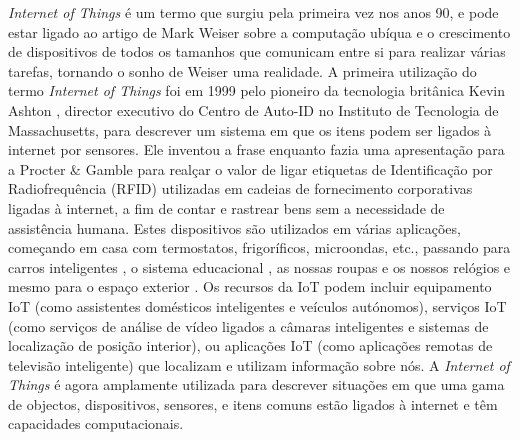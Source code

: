 \documentclass[conference]{IEEEtran}
\begin{document}

\textit{Internet of Things} é um termo que surgiu pela primeira vez nos anos
90, e pode estar ligado ao artigo de Mark Weiser sobre a computação ubíqua
\cite{weiser1991computer} e o crescimento de dispositivos de todos os tamanhos
que comunicam entre si para realizar várias tarefas, tornando o sonho de
Weiser uma realidade. A primeira utilização do termo \textit{Internet of
Things} foi em 1999 pelo pioneiro da tecnologia britânica Kevin Ashton \cite{KevinThat},
director executivo do Centro de Auto-ID no Instituto de Tecnologia de Massachusetts,
para descrever um sistema em que os itens podem ser ligados à internet por
sensores. Ele inventou a frase enquanto fazia uma apresentação para a Procter
\& Gamble para realçar o valor de ligar etiquetas de Identificação por Radiofrequência
(RFID) utilizadas em cadeias de fornecimento corporativas ligadas à internet,
a fim de contar e rastrear bens sem a necessidade de assistência humana.
Estes dispositivos são utilizados em várias aplicações, começando em casa
\cite{marikyan2019systematic} com termostatos, frigoríficos, microondas,
etc., passando para carros inteligentes \cite{arena2020overview}, o sistema
educacional \cite{al2020survey}, as nossas roupas e os nossos relógios \cite{niknejad2020comprehensive}
e mesmo para o espaço exterior \cite{AkyildizInternet}. Os recursos da IoT
podem incluir equipamento IoT (como assistentes domésticos inteligentes e
veículos autónomos), serviços IoT (como serviços de análise de vídeo ligados
a câmaras inteligentes e sistemas de localização de posição interior), ou
aplicações IoT (como aplicações remotas de televisão inteligente) que localizam
e utilizam informação sobre nós. A \textit{Internet of Things} é agora amplamente
utilizada para descrever situações em que uma gama de objectos, dispositivos,
sensores, e itens comuns estão ligados à internet e têm capacidades computacionais.
\end{document}
